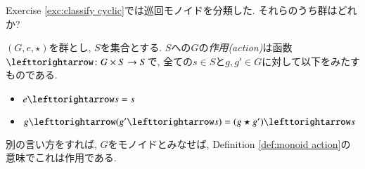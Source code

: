 \begin{exercise}
Exercise \ref{exc:classify cyclic}では巡回モノイドを分類した. それらのうち群はどれか?
\end{exercise}

\begin{definition}[群作用]\label{def:group action}


$(G,e,\star)$を群とし, $S$を集合とする. $S$への$G$の\emph{作用(action)}は函数$\acts\taking G\times S\to S$で, 全ての$s\in S$と$g,g'\in G$に対して以下をみたすものである.
\begin{itemize}
\item $e\acts s=s$
\item $g\acts(g'\acts s)=(g\star g')\acts s$
\end{itemize}
別の言い方をすれば, $G$をモノイドとみなせば, Definition \ref{def:monoid action}の意味でこれは作用である.

\end{definition}

